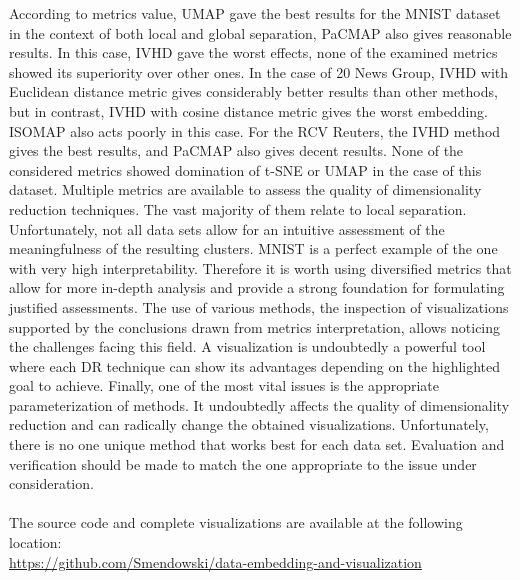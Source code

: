 \documentclass[12pt]{article}
\begin{document}
\clearpage
According to metrics value, UMAP gave the best results for the MNIST dataset in the context of both local and global separation, PaCMAP also gives reasonable results. In this case, IVHD gave the worst effects, none of the examined metrics showed its superiority over other ones. In the case of 20 News Group, IVHD with Euclidean distance metric gives considerably better results than other methods, but in contrast, IVHD with cosine distance metric gives the worst embedding. ISOMAP also acts poorly in this case. For the RCV Reuters, the IVHD method gives the best results, and PaCMAP also gives decent results. None of the considered metrics showed domination of t-SNE or UMAP in the case of this dataset. Multiple metrics are available to assess the quality of dimensionality reduction techniques. The vast majority of them relate to local separation. Unfortunately, not all data sets allow for an intuitive assessment of the meaningfulness of the resulting clusters. MNIST is a perfect example of the one with very high interpretability. Therefore it is worth using diversified metrics that allow for more in-depth analysis and provide a strong foundation for formulating justified assessments. The use of various methods, the inspection of visualizations supported by the conclusions drawn from metrics interpretation, allows noticing the challenges facing this field. A visualization is undoubtedly a powerful tool where each DR technique can show its advantages depending on the highlighted goal to achieve. Finally, one of the most vital issues is the appropriate parameterization of methods. It undoubtedly affects the quality of dimensionality reduction and can radically change the obtained visualizations. Unfortunately, there is no one unique method that works best for each data set. Evaluation and verification should be made to match the one appropriate to the issue under consideration.
\\ \\
The source code and complete visualizations are available at the following location: \\
\url{https://github.com/Smendowski/data-embedding-and-visualization}

\clearpage
\printbibliography
\end{document}
